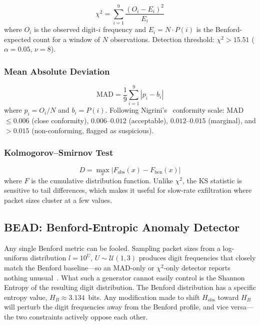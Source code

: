 \documentclass[conference]{IEEEtran}
\begin{document}
\begin{equation}
  \chi^2 = \sum_{i=1}^{9} \frac{(O_i - E_i)^2}{E_i}
  \label{eq:chi2}
\end{equation}
where $O_i$ is the observed digit-$i$ frequency and $E_i = N \cdot P(i)$ is
the Benford-expected count for a window of $N$ observations.
Detection threshold: $\chi^2 > 15.51$ ($\alpha = 0.05$, $\nu = 8$).

\subsubsection{Mean Absolute Deviation}

\begin{equation}
  \text{MAD} = \frac{1}{9}\sum_{i=1}^{9}\left|p_i - b_i\right|
  \label{eq:mad}
\end{equation}
where $p_i = O_i / N$ and $b_i = P(i)$. Following Nigrini's~\cite{b6}
conformity scale: MAD $\leq 0.006$ (close conformity), $0.006$--$0.012$
(acceptable), $0.012$--$0.015$ (marginal), and $>0.015$ (non-conforming,
flagged as suspicious).

\subsubsection{Kolmogorov--Smirnov Test}

\begin{equation}
  D = \max_{x}\bigl|F_{\mathrm{obs}}(x) - F_{\mathrm{ben}}(x)\bigr|
  \label{eq:ks}
\end{equation}
where $F$ is the cumulative distribution function. Unlike $\chi^2$, the
KS statistic is sensitive to tail differences, which makes it useful for
slow-rate exfiltration where packet sizes cluster at a few values.

\subsection{BEAD: Benford-Entropic Anomaly Detector}
\label{sec:hybrid}

Any single Benford metric can be fooled. Sampling packet sizes from a
log-uniform distribution $l = 10^U$, $U \sim \mathcal{U}(1,3)$ produces
digit frequencies that closely match the Benford baseline—so an
MAD-only or $\chi^2$-only detector reports nothing unusual~\cite{b3,b11}.
What such a generator cannot easily control is the Shannon Entropy of the
resulting digit distribution. The Benford distribution has a specific
entropy value, $H_B \approx 3.134$~bits. Any modification made to shift
$H_{\mathrm{obs}}$ toward $H_B$ will perturb the digit frequencies away
from the Benford profile, and vice versa—the two constraints actively
oppose each other.
\end{document}
